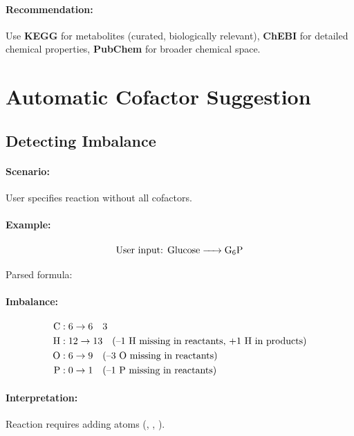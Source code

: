 \paragraph{Recommendation:} Use \textbf{KEGG} for metabolites (curated, biologically relevant), \textbf{ChEBI} for detailed chemical properties, \textbf{PubChem} for broader chemical space.

\section{Automatic Cofactor Suggestion}
\label{sec:cofactor-suggestion}

\subsection{Detecting Imbalance}
\label{subsec:detect-imbalance}

\paragraph{Scenario:} User specifies reaction without all cofactors.

\paragraph{Example:}
\begin{equation}
\text{User input: } \ce{Glucose -> G6P}
\end{equation}

Parsed formula: 

\paragraph{Imbalance:}
\begin{align}
\ce{C} &: 6 \to 6 \quad \checkmark \\
\ce{H} &: 12 \to 13 \quad \text{(--1 \ce{H} missing in reactants, +1 \ce{H} in products)} \\
\ce{O} &: 6 \to 9 \quad \text{(--3 \ce{O} missing in reactants)} \\
\ce{P} &: 0 \to 1 \quad \text{(--1 \ce{P} missing in reactants)}
\end{align}

\paragraph{Interpretation:} Reaction requires adding atoms (, , ).

